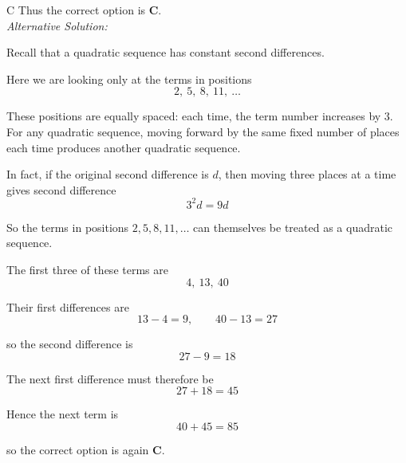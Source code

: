 \documentclass[11pt,a4paper]{article}
\begin{document}
\begin{enumerate}[label=\textbf{\arabic*.},leftmargin=*,itemsep=0pt,start=8]
\begin{djsSolution}{C}
Thus the correct option is \textbf{C}. \\[5pt]

\textit{Alternative Solution:}

Recall that a quadratic sequence has constant second differences.

Here we are looking only at the terms in positions
\[
2,\ 5,\ 8,\ 11,\ \ldots
\]

These positions are equally spaced: each time, the term number increases by $3$. For any quadratic sequence, moving forward by the same fixed number of places each time produces another quadratic sequence.

In fact, if the original second difference is $d$, then moving three places at a time gives second difference
\[
3^2d=9d
\]

So the terms in positions $2,5,8,11,\ldots$ can themselves be treated as a quadratic sequence. 

The first three of these terms are
\[
4,\ 13,\ 40
\]

Their first differences are
\[
13-4=9,\qquad 40-13=27
\]

so the second difference is
\[
27-9=18
\]

The next first difference must therefore be
\[
27+18=45
\]

Hence the next term is
\[
40+45=85
\]

so the correct option is again \textbf{C}.
\end{djsSolution}
\end{enumerate}
\clearpage
\thispagestyle{djssolutions}
\vspace*{8pt}
\end{document}
